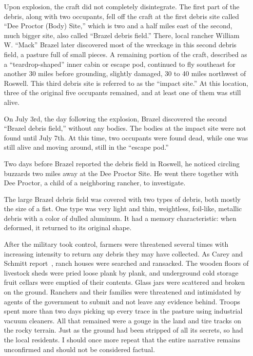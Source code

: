 Upon explosion, the craft did not completely disintegrate. The first part of the debris, along with two occupants, fell off the craft at the first debris site called ``Dee Proctor (Body) Site,'' which is two and a half miles east of the second, much bigger site, also called ``Brazel debris field.'' There, local rancher William W. ``Mack'' Brazel later discovered most of the wreckage in this second debris field, a pasture full of small pieces. A remaining portion of the craft, described as a ``teardrop-shaped'' inner cabin or escape pod, continued to fly southeast for another 30 miles before grounding, slightly damaged, 30 to 40 miles northwest of Roswell. This third debris site is referred to as the ``impact site.'' At this location, three of the original five occupants remained, and at least one of them was still alive.


On July 3rd, the day following the explosion, Brazel discovered the second ``Brazel debris field,'' without any bodies. The bodies at the impact site were not found until July 7th. At this time, two occupants were found dead, while one was still alive and moving around, still in the ``escape pod.''

Two days before Brazel reported the debris field in Roswell, he noticed circling buzzards two miles away at the Dee Proctor Site. He went there together with Dee Proctor, a child of a neighboring rancher, to investigate.

The large Brazel debris field was covered with two types of debris, both mostly the size of a fist. One type was very light and thin, weightless, foil-like, metallic debris with a color of dulled aluminum. It had a memory characteristic: when deformed, it returned to its original shape.

After the military took control, farmers were threatened several times with increasing intensity to return any debris they may have collected. As Carey and Schmitt report~\cite{CareySchmitt}, ranch houses were searched and ransacked. The wooden floors of livestock sheds were pried loose plank by plank, and underground cold storage fruit cellars were emptied of their contents. Glass jars were scattered and broken on the ground. Ranchers and their families were threatened and intimidated by agents of the government to submit and not leave any evidence behind. Troops spent more than two days picking up every trace in the pasture using industrial vacuum cleaners. All that remained were a gouge in the land and tire tracks on the rocky terrain. Just as the ground had been stripped of all its secrets, so had the local residents. I should once more repeat that the entire narrative remains unconfirmed and should not be considered factual.

